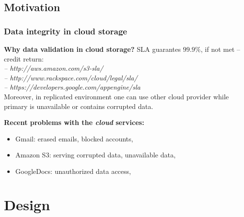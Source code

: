 \documentclass[compress]{beamer}
\begin{document}
\subsection{Motivation}
\begin{frame}
\frametitle{\textbf{Data integrity in cloud storage}}
\begin{block}{\textbf{Why data validation in cloud storage?}}
SLA guarantes $99.9\%$, if not met -- credit return:\\
\textit{-- http://aws.amazon.com/s3-sla/\\
-- http://www.rackspace.com/cloud/legal/sla/\\
-- https://developers.google.com/appengine/sla\\
}
Moreover, in replicated environment one can use other cloud provider while primary is unavailable or contains corrupted data.
\end{block}
\begin{exampleblock}{\textbf{Recent problems with the \textit{cloud} services:}}
\begin{itemize}
	\item Gmail: erased emails, blocked accounts,
	\item Amazon S3: serving corrupted data, unavailable data,
	\item GoogleDocs: unauthorized data access,
\end{itemize}
\end{exampleblock}
\end{frame}

\section{Design}
\end{document}
